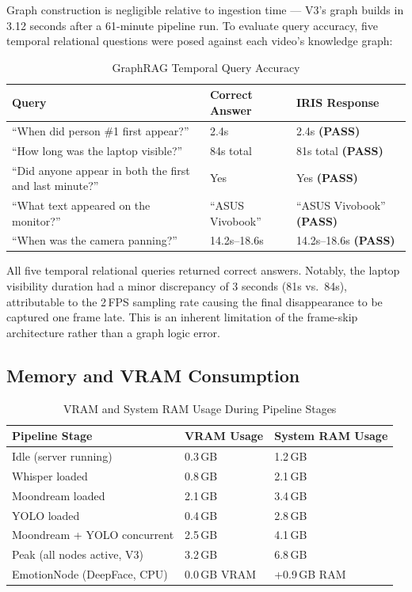 Graph construction is negligible relative to ingestion time --- V3's graph builds in 3.12 seconds after a 61-minute pipeline run. To evaluate query accuracy, five temporal relational questions were posed against each video's knowledge graph:

\begin{table}[H]
\centering
\small
\caption{GraphRAG Temporal Query Accuracy}
\label{tab:graph_accuracy}
\begin{tabular}{|p{6cm}|p{2.5cm}|p{3cm}|}
\hline
\rowcolor[HTML]{EFEFEF}
\textbf{Query} & \textbf{Correct Answer} & \textbf{IRIS Response} \\ \hline
``When did person \#1 first appear?'' & 2.4s & 2.4s \textbf{(PASS)} \\ \hline
``How long was the laptop visible?'' & 84s total & 81s total \textbf{(PASS)} \\ \hline
``Did anyone appear in both the first and last minute?'' & Yes & Yes \textbf{(PASS)} \\ \hline
``What text appeared on the monitor?'' & ``ASUS Vivobook'' & ``ASUS Vivobook'' \textbf{(PASS)} \\ \hline
``When was the camera panning?'' & 14.2s--18.6s & 14.2s--18.6s \textbf{(PASS)} \\ \hline
\end{tabular}
\end{table}

All five temporal relational queries returned correct answers. Notably, the laptop visibility duration had a minor discrepancy of 3 seconds (81s vs.\ 84s), attributable to the 2\,FPS sampling rate causing the final disappearance to be captured one frame late. This is an inherent limitation of the frame-skip architecture rather than a graph logic error.

\subsection{Memory and VRAM Consumption}

\begin{table}[H]
\centering
\small
\caption{VRAM and System RAM Usage During Pipeline Stages}
\label{tab:memory}
\begin{tabular}{|p{4cm}|p{3cm}|p{3.5cm}|}
\hline
\rowcolor[HTML]{EFEFEF}
\textbf{Pipeline Stage} & \textbf{VRAM Usage} & \textbf{System RAM Usage} \\ \hline
Idle (server running) & 0.3\,GB & 1.2\,GB \\ \hline
Whisper loaded & 0.8\,GB & 2.1\,GB \\ \hline
Moondream loaded & 2.1\,GB & 3.4\,GB \\ \hline
YOLO loaded & 0.4\,GB & 2.8\,GB \\ \hline
Moondream + YOLO concurrent & 2.5\,GB & 4.1\,GB \\ \hline
Peak (all nodes active, V3) & 3.2\,GB & 6.8\,GB \\ \hline
EmotionNode (DeepFace, CPU) & 0.0\,GB VRAM & +0.9\,GB RAM \\ \hline
\end{tabular}
\end{table}

